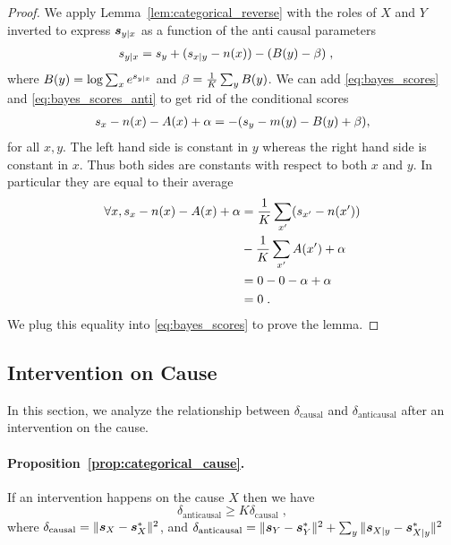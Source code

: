 \begin{subappendices}
\begin{proof}
We apply Lemma~\ref{lem:categorical_reverse} with the roles of $X$ and $Y$ inverted to express ${\bm{s}}_{y|x}$ as a function of the anti  causal parameters
\begin{align}
\label{eq:bayes_scores_anti}
    {s}_{y|x} &= {s}_y + ({s}_{x|y} - n(x)) - (B(y) - \beta) \; ,
\end{align}
where
$B(y) = \log \sum_x e^{{s}_{y|x}}$ 
and $\beta = \frac{1}{K} \sum_y B(y)$.
We can add \eqref{eq:bayes_scores} and \eqref{eq:bayes_scores_anti} 
to get rid of the conditional scores 
\begin{align*}
    {s}_x - n(x) - A(x) + \alpha
    = - ({s}_y - m(y) - B(y) + \beta), 
\end{align*}
for all $x,y$.
The left hand side is constant in $y$ whereas the right hand side is constant in $x$. 
Thus both sides are constants with respect to both $x$ and $y$. 
In particular they are equal to their average
\begin{align*}
    \forall x, 
    {s}_x - n(x) - A(x) + \alpha
    &= \frac{1}{K} \sum_{x'} ({s}_{x'} - n(x'))\\
    &-\frac{1}{K} \sum_{x'} A(x') + \alpha \\
    &= 0 - 0 - \alpha + \alpha \\
    &= 0 \; .
\end{align*}
We plug this equality into \eqref{eq:bayes_scores} to prove the lemma.
\end{proof}


\subsection{Intervention on Cause}
\label{apdx:categorical_analysis_cause}
In this section, we analyze the relationship between $\delta_\text{causal}$ and $\delta_\text{anticausal}$ after an intervention on the cause. 

\paragraph{Proposition~\ref{prop:categorical_cause}.}
\begin{itshape}
{If an intervention happens on the cause $X$ then we have}
\begin{equation}
    \boxed{
    \delta_\text{anticausal} \geq K \delta_\text{causal}} \; ,
\end{equation}
where $\delta_\text{causal} = \|{\bm{s}}_X - {\bm{s}}^*_X\|^2$, and $\delta_\text{anticausal} = \|{\bm{s}}_Y - {\bm{s}}^*_Y\|^2  + \sum_y \|{\bm{s}}_{X|y} - {\bm{s}}^*_{X|y}\|^2$
\end{itshape}
     



\end{subappendices}
